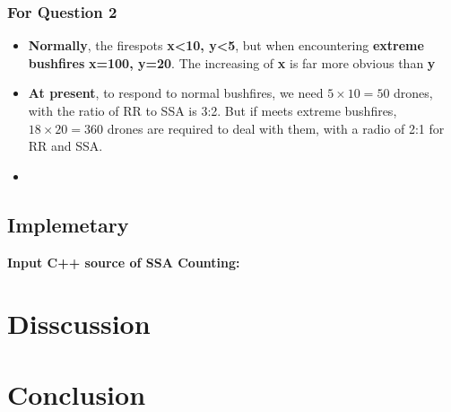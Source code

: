 \documentclass{mcmthesis}
\begin{document}
\subsubsection{For Question 2}
\begin{itemize}
  \item \textbf{Normally}, the firespots \textbf{x<10, y<5}, but when encountering
  \textbf{extreme bushfires} \textbf{x=100, y=20}. The increasing of \textbf{x} is far more obvious than \textbf{y}
  \item \textbf{At present}, to respond to normal bushfires, we need 
  $5\times10=50$ drones, with the ratio of RR to SSA is 3:2. But if 
  meets extreme bushfires, $18\times20=360$ drones are required to
  deal with them, with a radio of 2:1 for RR and SSA.
  \item 

\end{itemize}

\subsection{Implemetary}
\textcolor[rgb]{0.98,0.00,0.00}{\textbf{Input C++ source of SSA Counting:}}




\section{Disscussion}

\section{Conclusion}
\section{}
\end{document}
